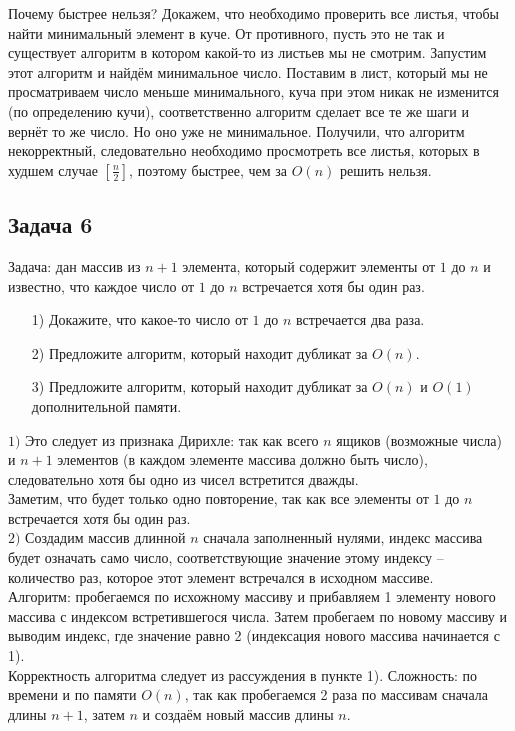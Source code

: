 \documentclass[a4paper,12pt]{article} %
\begin{document}
Почему быстрее нельзя? Докажем, что необходимо проверить все листья, чтобы найти минимальный элемент в куче. От противного, пусть это не так и существует алгоритм в котором какой-то из листьев мы не смотрим. Запустим этот алгоритм и найдём минимальное число. Поставим в лист, который мы не просматриваем число меньше минимального, куча при этом никак не изменится (по определению кучи), соответственно алгоритм сделает все те же шаги и вернёт то же число. Но оно уже не минимальное. Получили, что алгоритм некорректный, следовательно необходимо просмотреть все листья, которых в худшем случае $ \left[ \frac{n}{2} \right] $, поэтому быстрее, чем за $ O(n) $ решить нельзя. 


\subsection*{Задача 6}
Задача: дан массив из $n+1$ элемента, который содержит элементы от $1$ до $n$ и известно, что каждое число от $1$ до $n$ встречается хотя бы один раз. 
\begin{itemize}
\item[1) ] Докажите, что какое-то число от $1$ до $n$ встречается два раза.
\item[2) ] Предложите алгоритм, который находит дубликат за $O(n)$.
\item[3) ] Предложите алгоритм, который находит дубликат за $O(n)$ и $O(1)$ дополнительной памяти.
\end{itemize}

$1)$ Это следует из признака Дирихле: так как всего $ n $ ящиков (возможные числа) и $ n+1 $ элементов (в каждом элементе массива должно быть число), следовательно хотя бы одно из чисел встретится дважды.\\ Заметим, что будет только одно повторение, так как все элементы от $1$ до $n$ встречается хотя бы один раз. \\

$ 2) $ Создадим массив длинной $ n $ сначала заполненный нулями, индекс массива будет означать само число, соответствующие значение этому индексу -- количество раз, которое этот элемент встречался в исходном массиве.\\
Алгоритм: пробегаемся по исхожному массиву и прибавляем 1 элементу нового массива с индексом встретившегося числа. Затем пробегаем по новому массиву и выводим индекс, где значение равно 2 (индексация нового массива начинается с 1).\\
Корректность алгоритма следует из рассуждения в пункте 1). Сложность: по времени и по памяти  $O(n)$, так как пробегаемся 2 раза по массивам сначала длины $ n+1 $, затем $ n $ и создаём новый массив длины $ n $.\\
\end{document}
